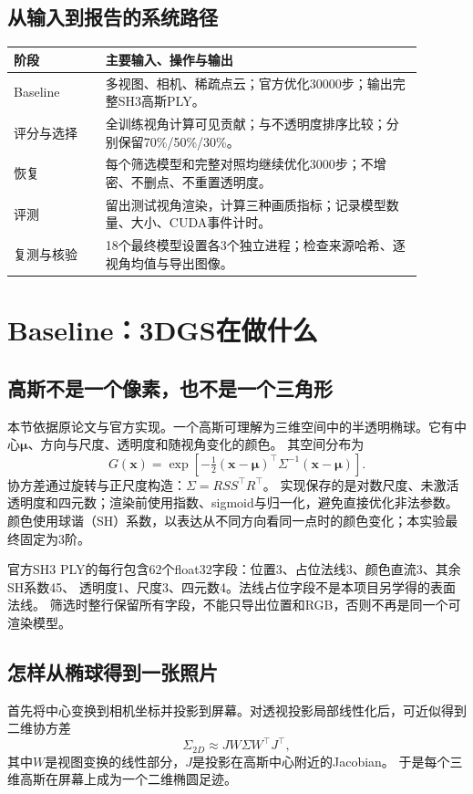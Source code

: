 \documentclass[UTF8,fontset=fandol,zihao=-4,a4paper]{ctexart}
\begin{document}
\subsection{从输入到报告的系统路径}
\begin{center}
\begin{tabular}{p{0.20\linewidth}p{0.69\linewidth}}
\toprule
阶段 & 主要输入、操作与输出 \\
\midrule
Baseline & 多视图、相机、稀疏点云；官方优化30000步；输出完整SH3高斯PLY。\\
评分与选择 & 全训练视角计算可见贡献；与不透明度排序比较；分别保留70\%/50\%/30\%。\\
恢复 & 每个筛选模型和完整对照均继续优化3000步；不增密、不删点、不重置透明度。\\
评测 & 留出测试视角渲染，计算三种画质指标；记录模型数量、大小、CUDA事件计时。\\
复测与核验 & 18个最终模型设置各3个独立进程；检查来源哈希、逐视角均值与导出图像。\\
\bottomrule
\end{tabular}
\end{center}

\section{Baseline：3DGS在做什么}
\subsection{高斯不是一个像素，也不是一个三角形}
本节依据原论文与官方实现\cite{kerbl,official}。一个高斯可理解为三维空间中的半透明椭球。它有中心$\boldsymbol\mu$、方向与尺度、透明度和随视角变化的颜色。
其空间分布为
\begin{equation}G(\mathbf{x})=\exp\!\left[-\tfrac12(\mathbf{x}-\boldsymbol\mu)^\top\Sigma^{-1}(\mathbf{x}-\boldsymbol\mu)\right].\end{equation}
协方差通过旋转与正尺度构造：$\Sigma=RSS^\top R^\top$。
实现保存的是对数尺度、未激活透明度和四元数；渲染前使用指数、sigmoid与归一化，避免直接优化非法参数。
颜色使用球谐（SH）系数，以表达从不同方向看同一点时的颜色变化；本实验最终固定为3阶。

官方SH3 PLY的每行包含62个float32字段：位置3、占位法线3、颜色直流3、其余SH系数45、
透明度1、尺度3、四元数4。法线占位字段不是本项目另学得的表面法线。
筛选时整行保留所有字段，不能只导出位置和RGB，否则不再是同一个可渲染模型。

\subsection{怎样从椭球得到一张照片}
首先将中心变换到相机坐标并投影到屏幕。对透视投影局部线性化后，可近似得到二维协方差
\begin{equation}\Sigma_{2D}\approx J W\Sigma W^\top J^\top,\end{equation}
其中$W$是视图变换的线性部分，$J$是投影在高斯中心附近的Jacobian。
于是每个三维高斯在屏幕上成为一个二维椭圆足迹。
\end{document}
